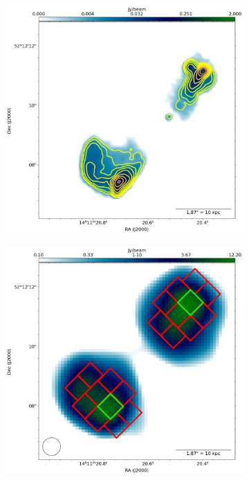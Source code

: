 \begin{figure}[h!]
	\centering
	\begin{subfigure}{.3\textwidth}
		\includegraphics[width=\linewidth]{3C295_martin_flux.png}
	\end{subfigure}
	\hfill	
	\begin{subfigure}{.3\textwidth}
		\vspace{0.45cm}
		\includegraphics[width=\linewidth]{ccplot_boxes_reg.png}

\end{subfigure}
\end{figure}
